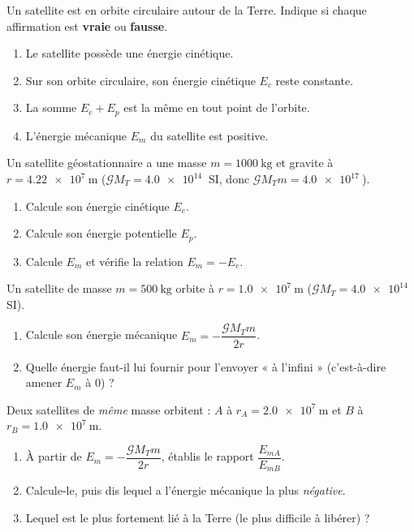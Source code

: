 \documentclass[11pt,a4paper]{article}
\begin{document}

\begin{exo}
Un satellite est en orbite circulaire autour de la Terre. Indique si chaque
affirmation est \textbf{vraie} ou \textbf{fausse}.
\begin{enumerate}[label=\alph*)]
  \item Le satellite possède une énergie cinétique.
  \item Sur son orbite circulaire, son énergie cinétique $E_c$ reste constante.
  \item La somme $E_c+E_p$ est la même en tout point de l'orbite.
  \item L'énergie mécanique $E_m$ du satellite est positive.
\end{enumerate}
\end{exo}

\begin{exo}
Un satellite géostationnaire a une masse $m=\qty{1000}{\kilogram}$ et gravite à
$r=\qty{4.22e7}{\metre}$ ($\mathcal{G}M_T=\qty{4.0e14}{}$ SI, donc
$\mathcal{G}M_T m=\qty{4.0e17}{}$).
\begin{enumerate}[label=\alph*)]
  \item Calcule son énergie cinétique $E_c$.
  \item Calcule son énergie potentielle $E_p$.
  \item Calcule $E_m$ et vérifie la relation $E_m=-E_c$.
\end{enumerate}
\end{exo}

\begin{exo}
Un satellite de masse $m=\qty{500}{\kilogram}$ orbite à $r=\qty{1.0e7}{\metre}$
($\mathcal{G}M_T=\qty{4.0e14}{}$ SI).
\begin{enumerate}[label=\alph*)]
  \item Calcule son énergie mécanique $E_m=-\dfrac{\mathcal{G}M_T m}{2r}$.
  \item Quelle énergie faut-il lui fournir pour l'envoyer « à l'infini »
        (c'est-à-dire amener $E_m$ à $0$) ?
\end{enumerate}
\end{exo}

\begin{exo}
Deux satellites de \emph{même} masse orbitent : $A$ à $r_A=\qty{2.0e7}{\metre}$ et
$B$ à $r_B=\qty{1.0e7}{\metre}$.
\begin{enumerate}[label=\alph*)]
  \item À partir de $E_m=-\dfrac{\mathcal{G}M_T m}{2r}$, établis le rapport
        $\dfrac{E_{mA}}{E_{mB}}$.
  \item Calcule-le, puis dis lequel a l'énergie mécanique la plus \emph{négative}.
  \item Lequel est le plus fortement lié à la Terre (le plus difficile à libérer) ?
\end{enumerate}
\end{exo}
\end{document}
